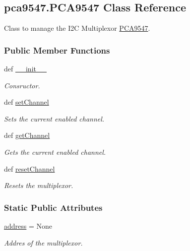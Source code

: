 \hypertarget{classpca9547_1_1_p_c_a9547}{\subsection{pca9547.\-P\-C\-A9547 Class Reference}
\label{classpca9547_1_1_p_c_a9547}
}


Class to manage the I2\-C Multiplexor \hyperlink{classpca9547_1_1_p_c_a9547}{P\-C\-A9547}.  


\subsubsection*{Public Member Functions}
\begin{DoxyCompactItemize}
\item 
def \hyperlink{classpca9547_1_1_p_c_a9547_a23b8693ebee5b2f8581b43843380de17}{\-\_\-\-\_\-init\-\_\-\-\_\-}
\begin{DoxyCompactList}\small\item\em Consructor. \end{DoxyCompactList}\item 
def \hyperlink{classpca9547_1_1_p_c_a9547_a5b8751a7eed5e81d8ba18b16bbcacbe0}{set\-Channel}
\begin{DoxyCompactList}\small\item\em Sets the current enabled channel. \end{DoxyCompactList}\item 
def \hyperlink{classpca9547_1_1_p_c_a9547_a86abcdfca17635d3aa4e7d2ce44f18d8}{get\-Channel}
\begin{DoxyCompactList}\small\item\em Gets the current enabled channel. \end{DoxyCompactList}\item 
def \hyperlink{classpca9547_1_1_p_c_a9547_a89f0831e00c136b4dc7c58c600f7794e}{reset\-Channel}
\begin{DoxyCompactList}\small\item\em Resets the multiplexor. \end{DoxyCompactList}\end{DoxyCompactItemize}
\subsubsection*{Static Public Attributes}
\begin{DoxyCompactItemize}
\item 
\hypertarget{classpca9547_1_1_p_c_a9547_a4f970ca67e4a1048f6c4c34c723c2452}{\hyperlink{classpca9547_1_1_p_c_a9547_a4f970ca67e4a1048f6c4c34c723c2452}{address} = None}\label{classpca9547_1_1_p_c_a9547_a4f970ca67e4a1048f6c4c34c723c2452}

\begin{DoxyCompactList}\small\item\em Addres of the multiplexor. \end{DoxyCompactList}\end{DoxyCompactItemize}


